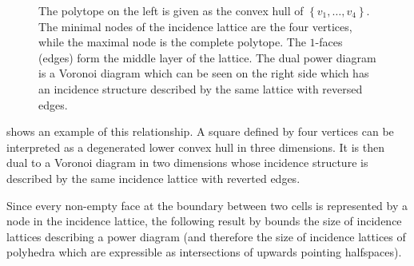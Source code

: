 \begin{figure}[tb]
    \caption{The polytope on the left is given as the convex hull of $\left\{ v_1, \dots, v_4 \right\}$.
    The minimal nodes of the incidence lattice are the four vertices, while the maximal node is the complete polytope. The $1$-faces (edges) form the middle layer of the lattice.
    The dual power diagram is a Voronoi diagram which can be seen on the right side which has an incidence structure described by the same lattice with reversed edges.}
    \label{fig:incidencelattice}
\end{figure}
 shows an example of this relationship.
A square defined by four vertices can be interpreted as a degenerated lower convex hull in three dimensions. It is then dual to a Voronoi diagram in two dimensions whose incidence structure is described by the same incidence lattice with reverted edges.

Since every non-empty face at the boundary between two cells is represented by a node in the incidence lattice, the following result by \textcite{brondsted2012introduction} bounds the size of incidence lattices describing a power diagram (and therefore the size of incidence lattices of polyhedra which are expressible as intersections of upwards pointing halfspaces).

